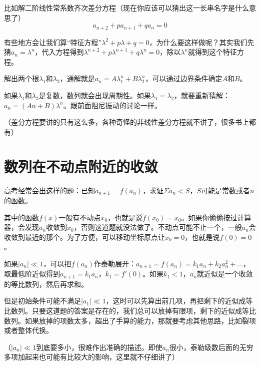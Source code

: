 比如解二阶线性常系数齐次差分方程（现在你应该可以猜出这一长串名字是什么意思了）
\begin{equation*}
a_{n+2}+p a_{n+1}+q a_n=0
\end{equation*}

有些地方会让我们算“特征方程”$\lambda^2+p \lambda+q=0$，为什么要这样做呢？其实我们先猜$a_n=\lambda^n$，代入方程得到$\lambda^{n+2}+p \lambda^{n+1}+q \lambda^n=0$，除以$\lambda^n$就得到这个特征方程。

解出两个根$\lambda_1$和$\lambda_2$，通解就是$a_n=A \lambda_1^n+B \lambda_2^n$，可以通过边界条件确定$A$和$B$。

如果$\lambda_1$和$\lambda_2$是复数，数列就会出现周期性。如果$\lambda_1=\lambda_2$，就要重新猜解：$a_n=(A n+B)\lambda^n$。跟前面阻尼振动的讨论一样。

（差分方程要讲的只有这么多，各种奇怪的非线性差分方程就不讲了，很多书上都有）
\section{数列在不动点附近的收敛}
高考经常会出这样的题：已知$a_{n+1}=f(a_n)$，求证$\Sigma a_n<S$，$S$可能是常数或者$n$的函数。

其中的函数$f(x)$一般有不动点$x_0$，也就是说$f(x_0)=x_0$。如果你偷偷按过计算器，会发现$a_n$收敛到$x_0$，否则这道题就没法做了。不动点可能不止一个，一般$a_n$会收敛到最近的那个。为了方便，可以移动坐标原点让$x_0=0$，也就是说$f(0)=0$。

如果$|a_n| \ll 1$，可以把$f(a_n)$作泰勒展开：$a_{n+1}=f(a_n)=k_1 a_n+k_2 a_n^2+\dots$，取最低阶近似得到$a_{n+1}=k_1 a_n$，$k_1=f'(0)$。如果$k_1<1$，$a_n$就近似是一个收敛的等比数列，然后再求和。

但是初始条件可能不满足$|a_1| \ll 1$，这时可以先算出前几项，再把剩下的近似成等比数列。只要这道题的答案是存在的，我们总可以放掉有限项，剩下的近似成等比数列。如果放掉的项数太多，超出了手算的能力，那就要考虑其他思路，比如裂项或者整体代换。

（$|a_n| \ll 1$到底要多小，很难作出准确的描述。即使$a_n$很小，泰勒级数后面的无穷多项加起来也可能有比较大的影响，这里就不仔细讲了）
